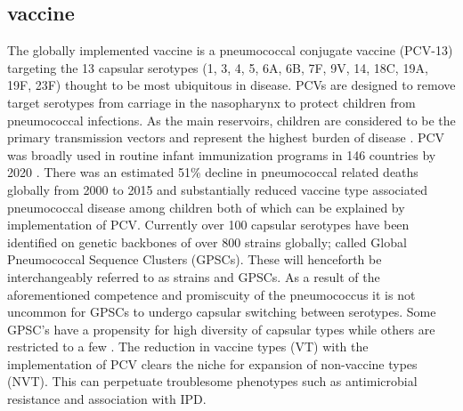 \documentclass{article}
\begin{document}
\subsection{vaccine} The globally implemented vaccine is a pneumococcal conjugate vaccine (PCV-13) targeting the 13 capsular serotypes (1, 3, 4, 5, 6A, 6B, 7F, 9V, 14, 18C, 19A, 19F, 23F) thought to be most ubiquitous in disease\cite{VaccineInformationStatement2019}. PCVs are designed to remove target serotypes from carriage in the nasopharynx to protect children from pneumococcal infections. As the main reservoirs, children are considered to be the primary transmission vectors and represent the highest burden of disease \cite{bogaertStreptococcusPneumoniaeColonisation2004,wyllieMolecularSurveillanceStreptococcus2016}. PCV was broadly used in routine infant immunization programs in 146 countries by 2020 \cite{VaccineInformationStatement2019}. There was an estimated 51\% decline in pneumococcal related deaths globally from 2000 to 2015 and substantially reduced vaccine type associated pneumococcal disease among children both of which can be explained by implementation of PCV\cite{wahlBurdenStreptococcusPneumoniae2018, pilishviliSustainedReductionsInvasive2010,vongottbergEffectsVaccinationInvasive2014}. Currently over 100 capsular serotypes have been identified on genetic backbones of over 800 strains globally; called Global Pneumococcal Sequence Clusters (GPSCs). These will henceforth be interchangeably referred to as strains and GPSCs. As a result of the aforementioned competence and promiscuity of the pneumococcus it is not uncommon for GPSCs to undergo capsular switching between serotypes. Some GPSC’s have a propensity for high diversity of capsular types while others are restricted to a few \cite{loPneumococcalLineagesAssociated2019}. The reduction in vaccine types (VT) with the implementation of PCV clears the niche for expansion of non-vaccine types (NVT). This can perpetuate troublesome phenotypes such as antimicrobial resistance and association with IPD.
\end{document}
